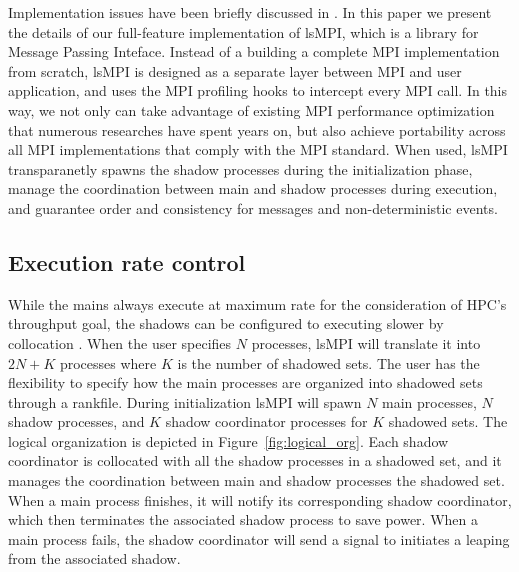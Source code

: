 Implementation issues have been briefly discussed in \cite{cui_2016_scalcom}. 
In this paper we present the details of our full-feature implementation of lsMPI, which is a library for Message Passing Inteface. 
Instead of a building a complete MPI implementation from scratch, lsMPI is designed as a separate layer between MPI and user application, and uses the MPI profiling hooks to intercept every MPI call. In this way, we not only can take advantage of existing MPI performance optimization that numerous researches have spent years on, but also achieve portability across all MPI implementations that comply with the MPI standard.
When used, lsMPI transparanetly spawns the shadow processes during the initialization phase, manage the coordination between main and shadow processes during execution, and guarantee order and consistency for messages and non-deterministic events.

\subsection{Execution rate control}
While the mains always execute at maximum rate for the consideration of HPC's throughput goal, the shadows can be configured to executing slower by collocation \cite{cui_2016_scalcom}. When the user specifies $N$ processes, lsMPI will translate it into $2N + K$ processes where $K$ is the number of shadowed sets. The user has the flexibility to specify how the main processes are organized into shadowed sets through a rankfile. During initialization lsMPI will spawn $N$ main processes, $N$ shadow processes, and $K$ shadow coordinator processes for $K$ shadowed sets. The logical organization is depicted in Figure~\ref{fig:logical_org}. Each shadow coordinator is collocated with all the shadow processes in a shadowed set, and it manages the coordination between main and shadow processes the shadowed set. When a main process finishes, it will notify its corresponding shadow coordinator, which then terminates the associated shadow process to save power. When a main process fails, the shadow coordinator will send a signal to initiates a leaping from the associated shadow.  

